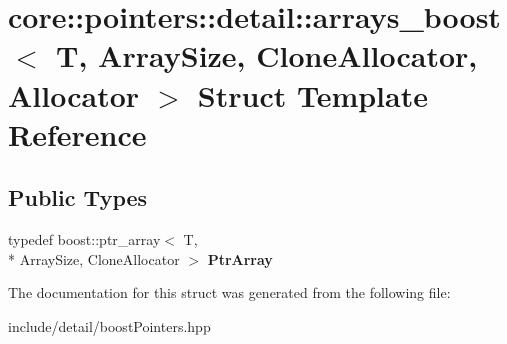 \hypertarget{structcore_1_1pointers_1_1detail_1_1arrays__boost}{\section{core\-:\-:pointers\-:\-:detail\-:\-:arrays\-\_\-boost$<$ T, Array\-Size, Clone\-Allocator, Allocator $>$ Struct Template Reference}
\label{structcore_1_1pointers_1_1detail_1_1arrays__boost}
}
\subsection*{Public Types}
\begin{DoxyCompactItemize}
\item 
\hypertarget{structcore_1_1pointers_1_1detail_1_1arrays__boost_a98baebb50e9922d54818c49e122c1a5b}{typedef boost\-::ptr\-\_\-array$<$ T, \\*
Array\-Size, Clone\-Allocator $>$ {\bfseries Ptr\-Array}}\label{structcore_1_1pointers_1_1detail_1_1arrays__boost_a98baebb50e9922d54818c49e122c1a5b}

\end{DoxyCompactItemize}


The documentation for this struct was generated from the following file\-:\begin{DoxyCompactItemize}
\item 
include/detail/boost\-Pointers.\-hpp\end{DoxyCompactItemize}
